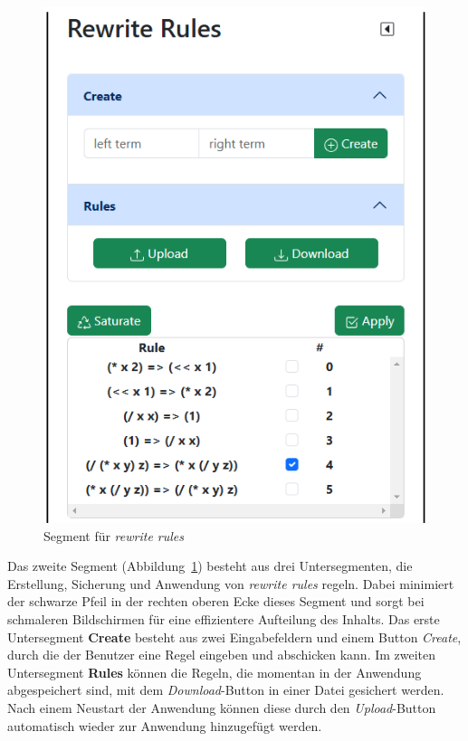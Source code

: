 \begin{figure}
    \vspace{-10mm}
    \begin{center}
      \includegraphics[scale=0.6]{../fig/rewriterulecontrol.png}
    \end{center}
    \caption{Segment für \textit{rewrite rules}}
    \label{fig:segment2}
\end{figure}

Das zweite Segment (Abbildung~\ref{fig:segment2}) besteht aus drei Untersegmenten, die Erstellung, Sicherung und Anwendung von \textit{rewrite rules} regeln. 
Dabei minimiert der schwarze Pfeil in der rechten oberen Ecke dieses Segment und sorgt bei schmaleren Bildschirmen für eine effizientere Aufteilung des Inhalts.
Das erste Untersegment \textbf{Create} besteht aus zwei Eingabefeldern und einem Button \textit{Create}, durch die der Benutzer eine Regel eingeben und abschicken kann.
Im zweiten Untersegment \textbf{Rules} können die Regeln, die momentan in der Anwendung abgespeichert sind, mit dem \textit{Download}-Button in einer Datei gesichert werden. 
Nach einem Neustart der Anwendung können diese durch den \textit{Upload}-Button automatisch wieder zur Anwendung hinzugefügt werden. 

